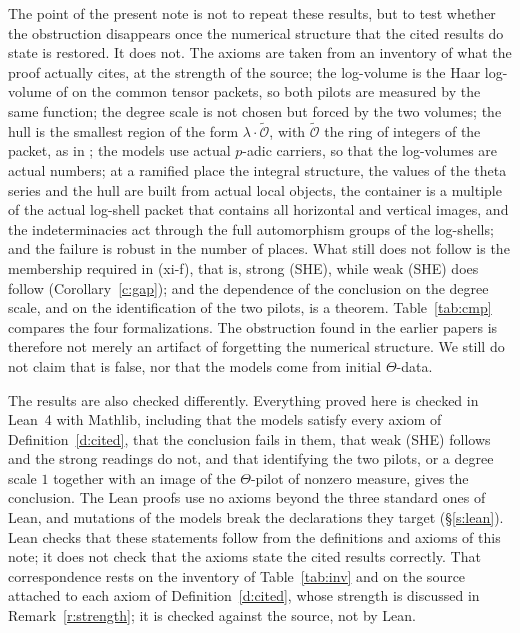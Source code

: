 \documentclass[11pt]{article}
\theoremstyle{plain}
\theoremstyle{definition}
\theoremstyle{remark}
\newcommand{\tO}{\widetilde{\mathcal O}}
\begin{document}
The point of the present note is not to repeat these results, but to test whether
the obstruction disappears once the numerical structure that the cited results do state is
restored. It does not. The axioms are taken from an inventory of what the proof actually
cites, at the strength of the source; the log-volume is the Haar log-volume of
\cite[Prop.~3.9]{IUT3} on the common tensor packets, so both pilots are measured by the
same function; the degree scale is not chosen but forced by the two volumes; the hull is
the smallest region of the form $\lambda\cdot\tO$, with $\tO$ the ring of integers of the
packet, as in \cite[Rem.~3.9.5(i)]{IUT3}; the models use actual $p$-adic carriers, so that
the log-volumes are actual numbers; at a ramified place the integral structure, the values
of the theta series and the hull are built from actual local objects, the container is a
multiple of the actual log-shell packet that contains all horizontal and vertical images,
and the indeterminacies act through the full automorphism groups of the log-shells; and the
failure is robust in the number of places. What still does not follow is the membership
required in (xi-f), that is, strong (SHE), while weak (SHE) does follow
(Corollary~\ref{c:gap}); and the dependence of the conclusion on the degree scale, and on
the identification of the two pilots, is a theorem. Table~\ref{tab:cmp} compares the
four formalizations. The obstruction found in the earlier papers is therefore not merely
an artifact of forgetting the numerical structure. We still do not claim that
\cite[Cor.~3.12]{IUT3} is false, nor that the models come from initial $\Theta$-data.

The results are also checked differently. Everything proved here is checked in Lean~4 with
Mathlib, including that the models satisfy every axiom of Definition~\ref{d:cited}, that the
conclusion fails in them, that weak (SHE) follows and the strong readings do not, and that
identifying the two pilots, or a degree scale $1$ together with an image of the
$\Theta$-pilot of nonzero measure, gives the conclusion. The Lean proofs use no axioms
beyond the three standard ones of Lean, and mutations of the models break the declarations
they target (\S\ref{s:lean}). Lean checks that these statements follow from
the definitions and axioms of this note; it does not check that the axioms state the cited
results correctly. That correspondence rests on the inventory of Table~\ref{tab:inv} and
on the source attached to each axiom of Definition~\ref{d:cited}, whose strength is
discussed in Remark~\ref{r:strength}; it is checked against the source, not by Lean.
\end{document}
